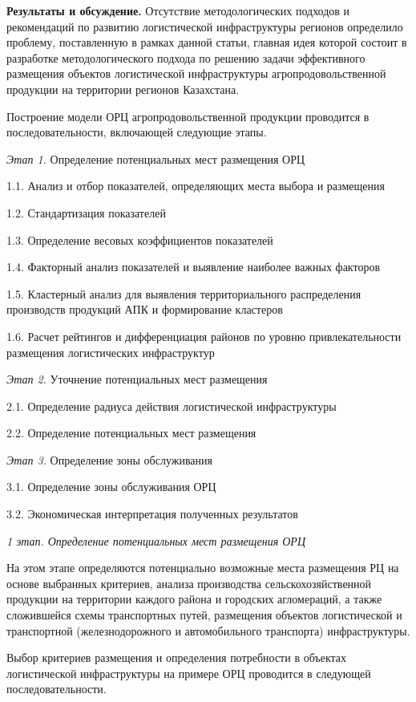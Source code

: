 {\bfseries Результаты и обсуждение.} Отсутствие методологических подходов и
рекомендаций по развитию логистической инфраструктуры регионов
определило проблему, поставленную в рамках данной статьи, главная идея
которой состоит в разработке методологического подхода по решению задачи
эффективного размещения объектов логистической инфраструктуры
агропродовольственной продукции на территории регионов Казахстана.

Построение модели ОРЦ агропродовольственной продукции проводится в
последовательности, включающей следующие этапы.

\emph{Этап 1.} Определение потенциальных мест размещения ОРЦ

1.1. Анализ и отбор показателей, определяющих места выбора и размещения

1.2. Стандартизация показателей

1.3. Определение весовых коэффициентов показателей

1.4. Факторный анализ показателей и выявление наиболее важных факторов

1.5. Кластерный анализ для выявления территориального распределения
производств продукций АПК и формирование кластеров

1.6. Расчет рейтингов и дифференциация районов по уровню
привлекательности размещения логистических инфраструктур

\emph{Этап 2.} Уточнение потенциальных мест размещения

2.1. Определение радиуса действия логистической инфраструктуры

2.2. Определение потенциальных мест размещения

\emph{Этап 3.} Определение зоны обслуживания

3.1. Определение зоны обслуживания ОРЦ

3.2. Экономическая интерпретация полученных результатов

\emph{1 этап. Определение потенциальных мест размещения ОРЦ}

На этом этапе определяются потенциально возможные места размещения РЦ на
основе выбранных критериев, анализа производства сельскохозяйственной
продукции на территории каждого района и городских агломераций, а также
сложившейся схемы транспортных путей, размещения объектов логистической
и транспортной (железнодорожного и автомобильного транспорта)
инфраструктуры.

Выбор критериев размещения и определения потребности в объектах
логистической инфраструктуры на примере ОРЦ проводится в следующей
последовательности.


